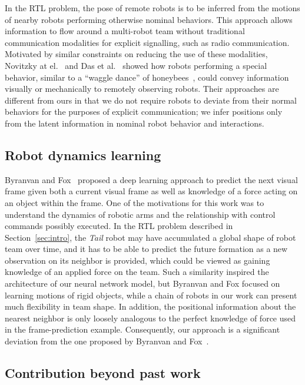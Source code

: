 \documentclass[letterpaper, 10 pt, conference]{ieeeconf}  %
\begin{document}
    In the RTL problem, the pose of remote robots is to be inferred from
    the motions of nearby robots performing otherwise nominal behaviors.
    This approach allows information to flow around a multi-robot team
    without traditional communication modalities for explicit
    signalling, such as radio communication. Motivated by similar
    constraints on reducing the use of these modalities, Novitzky at
    el.~\cite{NPCBW12} and Das et al.~\cite{DCV16} showed how robots
    performing a special behavior, similar to a ``waggle dance'' of
    honeybees~\cite{VonFrisch67}, could convey information visually or
    mechanically to remotely observing robots. Their approaches are
    different from ours in that we do not require robots to deviate from
    their normal behaviors for the purposes of explicit communication;
    we infer positions only from the latent information in nominal robot
    behavior and interactions.

	\subsection{Robot dynamics learning}
	\label{sec:robot_dynamics_learning}

    Byranvan and Fox~\cite{BF17} proposed a deep learning approach to
    predict the next visual frame given both a current visual frame as
    well as knowledge of a force acting on an object within the frame.
    One of the motivations for this work was to understand the dynamics
    of robotic arms and the relationship with control commands possibly
    executed. In the RTL problem described in Section~\ref{sec:intro},
    the \emph{Tail} robot may have accumulated a global shape of robot
    team over time, and it has to be able to predict the future
    formation as a new observation on its neighbor is provided, which
    could be viewed as gaining knowledge of an applied force on the
    team. Such a similarity inspired the architecture of our neural
    network model, but Byranvan and Fox focused on learning motions of
    rigid objects, while a chain of robots in our work can present much
    flexibility in team shape. In addition, the positional information
    about the nearest neighbor is only loosely analogous to the perfect
    knowledge of force used in the frame-prediction example.
    Consequently, our approach is a significant deviation from the one
    proposed by Byranvan and Fox~\cite{BF17}.

	\subsection{Contribution beyond past work}
	\label{sec:scalable_teammate_localization}
\end{document}

